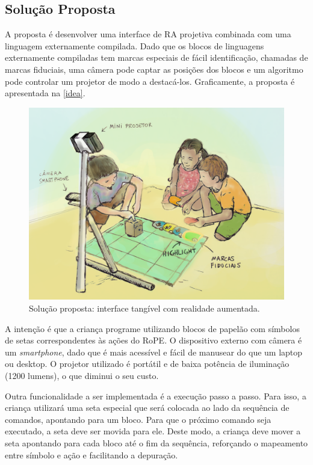 
\subsection{Solução Proposta}
\label{ss_cintro_solucao}

A proposta é desenvolver uma interface de \ac{RA} projetiva combinada com uma linguagem externamente compilada. Dado que os blocos de linguagens externamente compiladas tem marcas especiais de fácil identificação, chamadas de marcas fiduciais, uma câmera pode captar as posições dos blocos e um algoritmo pode controlar um projetor de modo a destacá-los. Graficamente, a proposta é apresentada na \autoref{idea}.
\begin{figure}[!htpb]
  \centering
  \includegraphics[width=.85\linewidth,fbox]{figs/idea_2.png}
  \caption{Solução proposta: interface tangível com realidade aumentada.}
  \sourceauthor
  \label{idea}
\end{figure}

A intenção é que a criança programe utilizando blocos de papelão com símbolos de setas correspondentes às ações do RoPE. O dispositivo externo com câmera é um \textit{smartphone}, dado que é mais acessível e fácil de manusear do que um laptop ou desktop. O projetor utilizado é portátil e de baixa potência de iluminação (1200 lumens), o que diminui o seu custo.

Outra funcionalidade a ser implementada é a execução passo a passo. Para isso, a criança utilizará uma seta especial que será colocada ao lado da sequência de comandos, apontando para um bloco. Para que o próximo comando seja executado, a seta deve ser movida para ele. Deste modo, a criança deve mover a seta apontando para cada bloco até o fim da sequência, reforçando o mapeamento entre símbolo e ação e facilitando a depuração.

